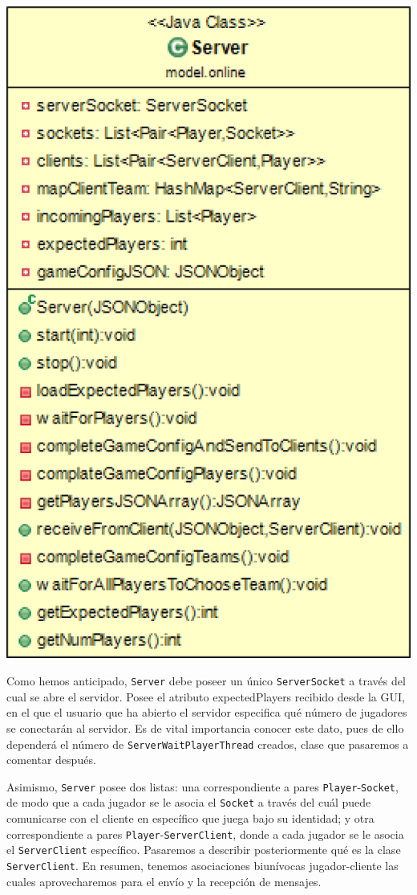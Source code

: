 \documentclass[12pt,a4paper,openright]{book}
\theoremstyle{break}
\begin{document}
\begin{center}
\includegraphics[scale=0.3]{Server-sprint7.png} 
\end{center}

Como hemos anticipado, \texttt{Server} debe poseer un único \texttt{ServerSocket} a través del cual se abre el servidor. Posee el atributo expectedPlayers recibido desde la GUI, en el que el usuario que ha abierto el servidor especifica qué número de jugadores se conectarán al servidor. Es de vital importancia conocer este dato, pues de ello dependerá el número de \texttt{ServerWaitPlayerThread} creados, clase que pasaremos a comentar después.

Asimismo, \texttt{Server} posee dos listas: una correspondiente a pares \texttt{Player}-\texttt{Socket}, de modo que a cada jugador se le asocia el \texttt{Socket} a través del cuál puede comunicarse con el cliente en específico que juega bajo su identidad; y otra correspondiente a pares \texttt{Player}-\texttt{ServerClient}, donde a cada jugador se le asocia el \texttt{ServerClient} específico. Pasaremos a describir posteriormente qué es la clase \texttt{ServerClient}.
En resumen, tenemos asociaciones biunívocas jugador-cliente las cuales aprovecharemos para el envío y la recepción de mensajes.
\end{document}

